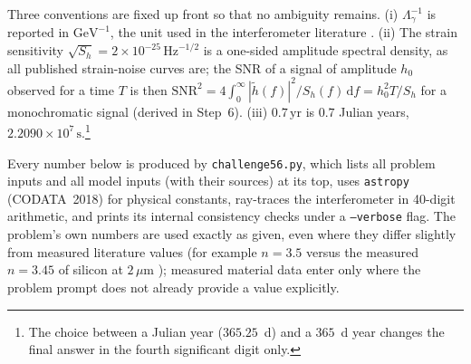 Three conventions are fixed up front so that no ambiguity remains. (i) $\Lambda_\gamma^{-1}$ is reported in $\mathrm{GeV}^{-1}$, the unit used in the interferometer literature \citep{GroteStadnik2019,Vermeulen2021}. (ii) The strain sensitivity $\sqrt{S_h}=2\times10^{-25}\,\mathrm{Hz}^{-1/2}$ is a one-sided amplitude spectral density, as all published strain-noise curves are; the SNR of a signal of amplitude $h_0$ observed for a time $T$ is then $\mathrm{SNR}^2=4\int_0^\infty|\tilde h(f)|^2/S_h(f)\,\mathrm{d}f=h_0^2T/S_h$ for a monochromatic signal (derived in Step~6). (iii) $0.7\,\mathrm{yr}$ is $0.7$ Julian years, $2.2090\times10^{7}\,\mathrm{s}$.\footnote{The choice between a Julian year ($365.25$~d) and a $365$~d year changes the final answer in the fourth significant digit only.}

Every number below is produced by \texttt{challenge56.py}, which lists all problem inputs and all model inputs (with their sources) at its top, uses \texttt{astropy} (CODATA~2018) for physical constants, ray-traces the interferometer in 40-digit arithmetic, and prints its internal consistency checks under a \texttt{--verbose} flag. The problem's own numbers are used exactly as given, even where they differ slightly from measured literature values (for example $n=3.5$ versus the measured $n=3.45$ of silicon at $2\,\mu$m \citep{Frey2006}); measured material data enter only where the problem prompt does not already provide a value explicitly.

